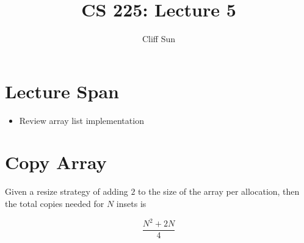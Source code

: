 \documentclass{article}
\title{CS 225: Lecture 5}
\author{Cliff Sun}
\newtheorem{one minute paper}[theorem]{One Minute Paper}
\begin{document}
\maketitle

\section*{Lecture Span}
\begin{itemize}
    \item Review array list implementation
\end{itemize}

\section*{Copy Array}

Given a resize strategy of adding $2$ to the size of the array per allocation, then the total copies needed for $N$ insets is 

\begin{equation}
    \frac{N^2 + 2N}{4}
\end{equation}
\end{document}
